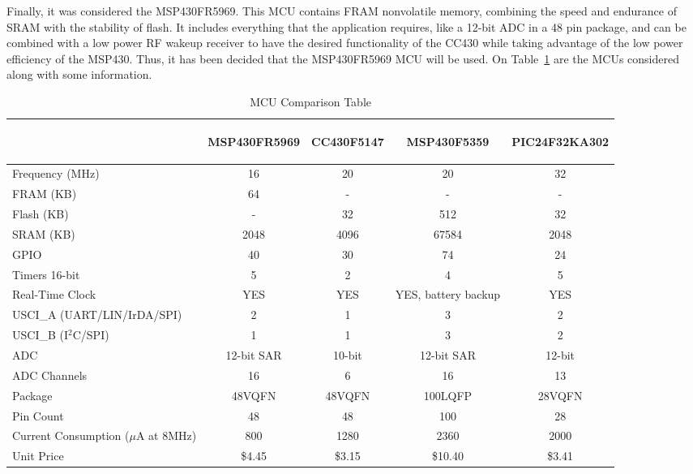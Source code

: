 Finally, it was considered the MSP430FR5969. This MCU contains FRAM nonvolatile memory, combining the speed and endurance of SRAM with the stability of flash. It includes everything that the application requires, like a 12-bit ADC in a 48 pin package, and can be combined with a low power RF wakeup receiver to have the desired functionality of the CC430 while taking advantage of the low power efficiency of the MSP430. Thus, it has been decided that the MSP430FR5969 MCU will be used. On Table~\ref{tab:mcuComp} are the MCUs considered along with some information.
\begin{table}[H]
\setlength{\extrarowheight}{1.5pt}
  \centering
  \caption{MCU Comparison Table}
    \begin{tabular}{|m{1.5in}|c|c|c|c|}
    \cline{2-5}
    \multicolumn{1}{c|}{} & \begin{sideways}MSP430FR5969 \end{sideways} &\begin{sideways} CC430F5147 \end{sideways}& \begin{sideways}MSP430F5359 \end{sideways}& \begin{sideways}PIC24F32KA302\end{sideways}\\ 
    \hline
    Frequency (MHz) & 16    & 20    & 20    & 32\\ \hline
    FRAM (KB) & 64    & -     & -     & -\\ \hline
    Flash (KB) & -     & 32    & 512   & 32\\ \hline
    SRAM (KB) & 2048  & 4096  & 67584 & 2048 \\ \hline
    GPIO  & 40    & 30    & 74    & 24    \\ \hline
    Timers 16-bit & 5     & 2     & 4     & 5     \\ \hline
    Real-Time Clock & YES   & YES   & YES, battery backup & YES   \\ \hline
    USCI\_A (UART/LIN/IrDA/SPI) & 2     & 1     & 3     & 2     \\ \hline
    USCI\_B (I$^2$C/SPI) & 1     & 1     & 3     & 2     \\ \hline
    ADC   & 12-bit SAR & 10-bit & 12-bit SAR & 12-bit \\ \hline
    ADC Channels & 16    & 6     & 16    & 13    \\ \hline
    Package & 48VQFN & 48VQFN & 100LQFP & 28VQFN \\ \hline
    Pin Count & 48    & 48    & 100   & 28    \\ \hline
    Current Consumption ($\mu$A at 8MHz) & 800   & 1280  & 2360  & 2000  \\ \hline
    Unit Price & \$4.45  & \$3.15  & \$10.40 & \$3.41  \\ \hline
    \end{tabular}%
  \label{tab:mcuComp}%
\end{table}%
